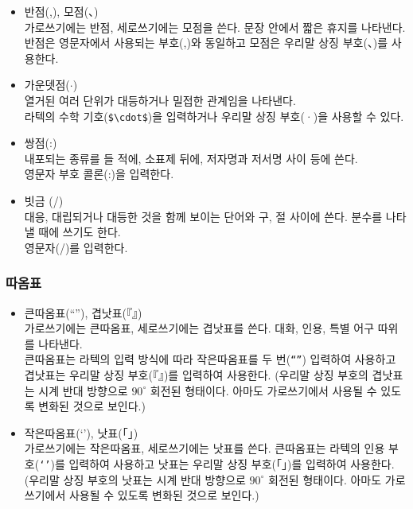\begin{itemize}
\item 반점(,), 모점(、)\\
  가로쓰기에는 반점, 세로쓰기에는 모점을 쓴다.  문장 안에서 짧은
  휴지를 나타낸다.\\
  반점은 영문자에서 사용되는 부호(,)와 동일하고 모점은 우리말 상징
  부호(、)를 사용한다.

\item 가운뎃점($\cdot$)\\
  열거된 여러 단위가 대등하거나 밀접한 관계임을 나타낸다.\\
  라텍의 수학 기호(\texttt{\$\textbackslash cdot\$})을 입력하거나
  우리말 상징 부호(·)을 사용할 수 있다.

\item 쌍점(:)\\
  내포되는 종류를 들 적에, 소표제 뒤에, 저자명과 저서명 사이 등에
  쓴다.\\
  영문자 부호 콜론(:)을 입력한다.

\item 빗금 (/)\\
  대응, 대립되거나 대등한 것을 함께 보이는 단어와 구, 절 사이에 쓴다.
  분수를 나타낼 때에 쓰기도 한다.\\
  영문자(/)를 입력한다.

\end{itemize}

\subsubsection{따옴표}

\begin{itemize}
\item 큰따옴표(``''), 겹낫표(『』)\\
  가로쓰기에는 큰따옴표, 세로쓰기에는 겹낫표를 쓴다.  대화, 인용,
  특별 어구 따위를 나타낸다.\\
  큰따옴표는 라텍의 입력 방식에 따라 작은따옴표를 두 번(\texttt{``''})
  입력하여 사용하고 겹낫표는 우리말 상징 부호(『』)를 입력하여
  사용한다.  (우리말 상징 부호의 겹낫표는 시계 반대 방향으로
  $90^\circ$ 회전된 형태이다.  아마도 가로쓰기에서
  사용될 수 있도록 변화된 것으로 보인다.)

\item 작은따옴표(`'), 낫표(「」)\\
  가로쓰기에는 작은따옴표, 세로쓰기에는 낫표를 쓴다.  큰따옴표는 라텍의
  인용 부호(\texttt{`'})를 입력하여 사용하고 낫표는 우리말 상징
  부호(「」)를 입력하여 사용한다.  (우리말 상징 부호의 낫표는 시계 반대
  방향으로 $90^\circ$ 회전된 형태이다.  아마도 가로쓰기에서
  사용될 수 있도록 변화된 것으로 보인다.)

\end{itemize}

